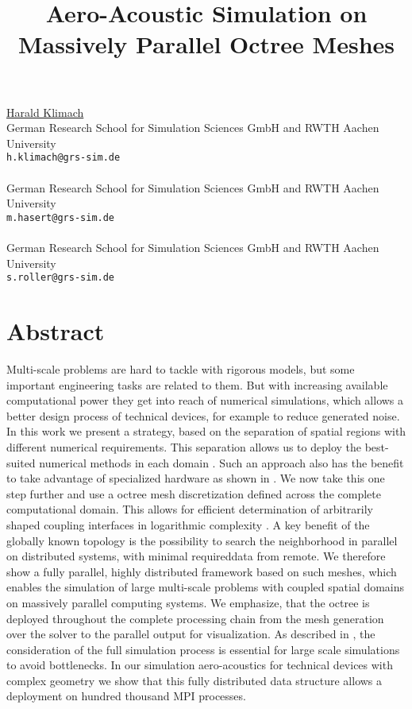 \title{Aero-Acoustic Simulation on Massively Parallel Octree Meshes}
 \author{} \institute{}
\maketitle
\begin{center}
{\large \underline{Harald Klimach}}\\
German Research School for Simulation Sciences GmbH and RWTH Aachen University\\
{\tt h.klimach@grs-sim.de}
\\ \vspace{4mm}{\large Manuel Hasert}\\
German Research School for Simulation Sciences GmbH and RWTH Aachen University \\
{\tt m.hasert@grs-sim.de}
\\ \vspace{4mm}{\large Sabine Roller}\\
German Research School for Simulation Sciences GmbH and RWTH Aachen University\\
{\tt s.roller@grs-sim.de}

\end{center}

\section*{Abstract}

Multi-scale problems are hard to tackle with rigorous
models, but some important engineering tasks are related to them.
But with increasing available computational power they get into reach of 
numerical simulations, which allows a better design process of technical devices,
for example to reduce generated noise.
In this work we present a strategy, based on the separation of spatial regions
with different numerical requirements.
This separation allows us to deploy the best-suited numerical methods in each
domain \cite{utzmann-2006}.
Such an approach also has the benefit to take advantage of specialized hardware
as shown in \cite{klimach-2009}. We now take this one step further and use a octree mesh discretization defined across the complete computational domain.
This allows for efficient determination of arbitrarily shaped coupling
interfaces in logarithmic complexity \cite{meagher-1982}. A key benefit of the globally known topology is the possibility to search the
neighborhood in parallel on distributed systems, with minimal requireddata from remote.
We therefore show a fully parallel, highly distributed framework based on such 
meshes, which enables the simulation of large multi-scale problems with coupled 
spatial domains on massively parallel computing systems.
We emphasize, that the octree is deployed throughout the complete processing
chain from the mesh generation over the solver to the parallel output for
visualization.
As described in \cite{tu-2006}, the consideration of the full simulation process 
is essential for large scale simulations to avoid bottlenecks.
In our simulation aero-acoustics for technical devices with complex geometry we show that this fully distributed data structure allows a
deployment on hundred thousand MPI processes.


